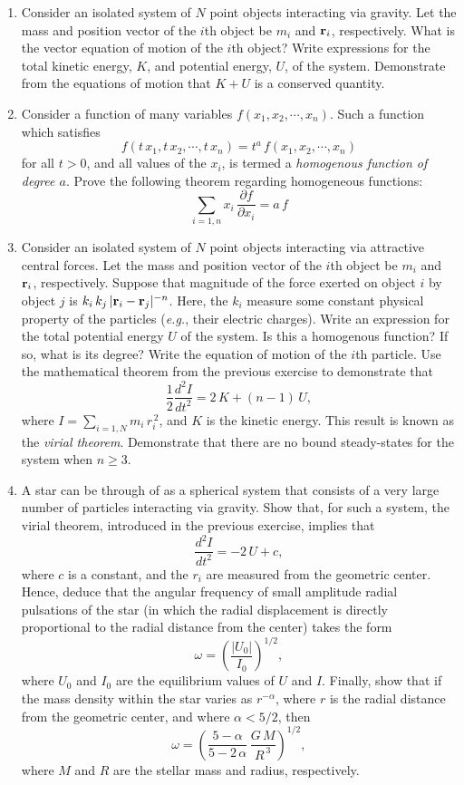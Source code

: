 {\small
\renewcommand{\theenumi}{2.\arabic{enumi}}
\begin{enumerate}
\item Consider an isolated system of $N$ point objects interacting via
gravity. Let the mass and position vector of the $i$th object be
 $m_i$ and  ${\bf r}_i$, respectively. What is  the vector equation
 of motion of the $i$th object? Write expressions for the total
 kinetic energy, $K$, and potential energy, $U$, of the system.
 Demonstrate from the equations of motion  that $K+U$ is a conserved quantity.
 
 \item Consider a function of many variables $f(x_1,x_2,\cdots,x_n)$. 
 Such a function which satisfies
 $$
 f(t\,x_1, t\,x_2,\cdots,t\,x_n) = t^a\,f(x_1,x_2,\cdots,x_n)
 $$
 for all $t>0$, and all values of the $x_i$, is termed a {\em homogenous function of degree $a$}. 
 Prove the following theorem regarding homogeneous functions:
 $$
 \sum_{i=1,n} x_i\,\frac{\partial f}{\partial x_i} = a\,f
 $$
 
  \item Consider an isolated system of $N$ point objects interacting via
attractive central forces. Let the mass and position vector of the $i$th object be
 $m_i$ and  ${\bf r}_i$, respectively. Suppose that magnitude of the force exerted on object $i$ by
object $j$ is $k_i\,k_j\,|{\bf r}_i-{\bf r}_j|^{-n}$. Here, the $k_i$ measure
some constant physical
property of the particles ({\em e.g.}, their electric charges). Write
an expression for the total potential energy $U$ of the system. Is
this a homogenous function? If so, what is its degree?
Write the equation of motion of the $i$th particle. Use the mathematical
theorem from the previous exercise to demonstrate that
$$
\frac{1}{2}\frac{d^2 I}{dt^2} = 2\,K + (n-1)\,U,
$$
where $I=\sum_{i=1,N} m_i\, r_i^{\,2}$, and $K$ is the kinetic energy.
This result is known as the {\em virial theorem}.
Demonstrate that there are no bound steady-states for the system
when $n\geq 3$. 
 
\item A star can be through of as a spherical system that consists of a very large number of particles interacting
via gravity.  Show that, for such a system, the virial theorem, introduced in the previous exercise, implies that
$$
\frac{d^2 I}{dt^2} = -2\,U + c,
$$
where $c$ is a constant, and the $r_i$ are measured from the geometric center. Hence, deduce that the angular frequency of small amplitude radial pulsations
of the star (in which the radial displacement is directly proportional to the radial distance from the center) takes the form
$$
\omega = \left(\frac{|U_0|}{I_0}\right)^{1/2},
$$
where $U_0$ and $I_0$ are the equilibrium values of $U$ and $I$. Finally, show that if the mass
density within the star varies as $r^{-\alpha}$, where $r$ is the radial distance from the geometric center, and where $\alpha<5/2$, then
$$
\omega = \left(\frac{5-\alpha}{5-2\,\alpha}\,\frac{G\,M}{R^{\,3}}\right)^{1/2},
$$
where $M$ and $R$ are the stellar mass and radius, respectively.
 

\end{enumerate}}
